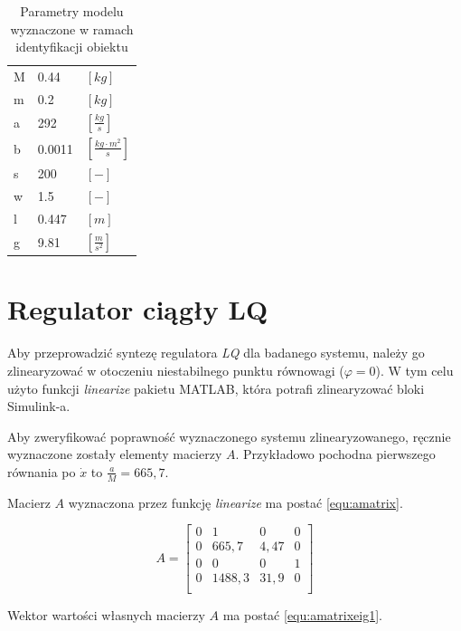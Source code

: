 \documentclass[12pt]{article}
\begin{document}
\begin{table}[!htb]
    \centering
    \begin{tabular}{|l|l|l|}
        \hline
        M & 0.44 & $[kg]$ \\
        m & 0.2 & $[kg]$ \\
        a & 292 & $[\frac{kg}{s}]$ \\
        b & 0.0011 & $[\frac{kg\cdot m^2}{s}]$ \\
        s & 200 & $[-]$ \\
        w & 1.5 & $[-]$ \\
        l & 0.447 & $[m]$ \\
        g & 9.81 & $[\frac{m}{s^2}]$ \\[0.01cm]
        \hline
    \end{tabular}
    \caption{Parametry modelu wyznaczone w ramach identyfikacji obiektu}
    \label{tab:parametry}
\end{table}

\newpage

\section{Regulator ciągły LQ}

Aby przeprowadzić syntezę regulatora \textit{LQ} dla badanego systemu, należy go
zlinearyzować w otoczeniu niestabilnego punktu równowagi ($\varphi = 0$). W tym
celu użyto funkcji \textit{linearize} pakietu \textrm{MATLAB}, która potrafi
zlinearyzować bloki \textrm{Simulink}-a.

Aby zweryfikować poprawność wyznaczonego systemu zlinearyzowanego,
ręcznie wyznaczone zostały elementy macierzy $A$. Przykładowo pochodna
pierwszego równania po $\dot{x}$ to $\frac{a}{M} = 665,7$.

Macierz $A$ wyznaczona przez funkcję \textit{linearize} ma postać
\eqref{equ:amatrix}.

\begin{equation}
    A = 
    \begin{bmatrix}
        0 & 1 & 0 & 0\\
        0 & 665,7 & 4,47 & 0\\
        0 & 0 & 0 & 1\\
        0 & 1488,3 & 31,9 & 0\\
    \end{bmatrix}
    \label{equ:amatrix}
\end{equation}

Wektor wartości własnych macierzy $A$ ma postać \eqref{equ:amatrixeig1}.
\end{document}

